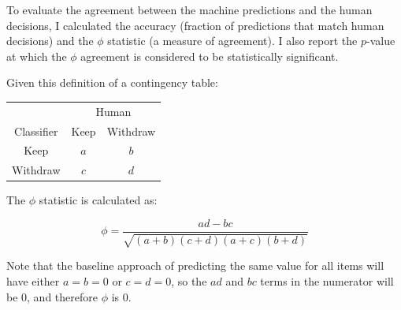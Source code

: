 \documentclass[man,11pt]{apa6}
\begin{document}
To evaluate the agreement between the machine predictions and the
human decisions, I calculated the accuracy (fraction of predictions
that match human decisions) and the $\phi$ statistic (a measure of
agreement).  I also report the $p$-value at which the $\phi$ agreement
is considered to be statistically significant.

Given this definition of a contingency table:

\singlespacing
\begin{center}
\begin{tabular}{c|cc} 
 & \multicolumn{2}{c}{Human} \\
Classifier & Keep & Withdraw \\ \hline
Keep     & $a$ & $b$ \\ 
Withdraw & $c$ & $d$ \\ \hline
\end{tabular}
\end{center}
\doublespacing

The $\phi$ statistic is calculated as:

\begin{equation}
\phi = \frac{ad-bc}{\sqrt{(a+b)(c+d)(a+c)(b+d)}}
\end{equation}

Note that the baseline approach of predicting the same value for all
items will have either $a = b = 0$ or $c = d = 0$, so the $ad$ and
$bc$ terms in the numerator will be 0, and therefore $\phi$ is 0.

\end{document}
